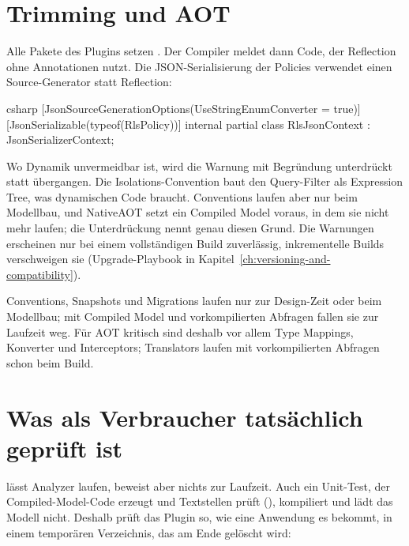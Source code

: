 \section{Trimming und AOT}

Alle Pakete des Plugins setzen
.
Der Compiler meldet dann Code, der Reflection ohne Annotationen nutzt. Die
JSON-Serialisierung der Policies verwendet einen Source-Generator statt Reflection:

\begin{sourcecode}{csharp}
[JsonSourceGenerationOptions(UseStringEnumConverter = true)]
[JsonSerializable(typeof(RlsPolicy))]
internal partial class RlsJsonContext : JsonSerializerContext;
\end{sourcecode}

Wo Dynamik unvermeidbar ist, wird die Warnung mit Begründung unterdrückt statt übergangen. Die
Isolations-Convention baut den Query-Filter als Expression Tree, was dynamischen Code
braucht. Conventions laufen aber nur beim Modellbau, und NativeAOT setzt ein Compiled Model
voraus, in dem sie nicht mehr laufen; die Unterdrückung nennt genau diesen Grund. Die
Warnungen erscheinen nur bei einem vollständigen Build zuverlässig, inkrementelle Builds
verschweigen sie (Upgrade-Playbook in Kapitel~\ref{ch:versioning-and-compatibility}).

\begin{note}
  Conventions, Snapshots und Migrations laufen nur zur Design-Zeit oder beim Modellbau; mit
  Compiled Model und vorkompilierten Abfragen fallen sie zur Laufzeit weg. Für AOT kritisch
  sind deshalb vor allem Type Mappings, Konverter und Interceptors; Translators laufen mit
  vorkompilierten Abfragen schon beim Build.
\end{note}

\section{Was als Verbraucher tatsächlich geprüft ist}\label{sec:consumer-test}

 lässt Analyzer laufen, beweist aber nichts zur
Laufzeit. Auch ein Unit-Test, der Compiled-Model-Code erzeugt und Textstellen prüft
(), kompiliert und lädt das Modell nicht.
Deshalb prüft 
das Plugin so, wie eine Anwendung es bekommt, in einem temporären Verzeichnis, das am Ende
gelöscht wird:

